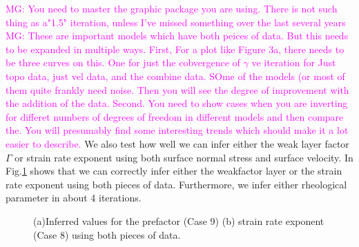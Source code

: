 \documentclass[12pt]{article}
\newcommand{\mgnote}[1]{\textcolor{magenta}{MG: #1}}
\begin{document}
\mgnote{You need to master the graphic package you are using. There is not such thing as a"1.5" iteration, unless I've missed something over the last several years}
\mgnote{These are important models which have both peices of data. But this needs to be expanded in multiple ways. First, For a plot like Figure 3a, there needs to be three curves on this. One for just the cobvergence of $\gamma$ ve iteration for Just topo data, just vel data, and the combine data. SOme of the models (or most of them quite frankly need noise. Then you will see the degree of improvement with the addition of the data. Second. You need to show cases when you are inverting for differet numbers of degrees of freedom in different models and then compare the. You will presumably find some interesting trends which should make it a lot easier to describe.}
We also test how well we can infer either the weak layer factor $\Gamma$ or strain rate exponent using both surface normal stress and surface velocity. In Fig.\ref{fig:joint_inversion} shows that we can correctly infer either the weakfactor layer or the strain rate exponent using both pieces of data. Furthermore, we infer either rheological parameter in about 4 iterations.
\begin{figure}[H]
\centering
{}
  \caption{(a)Inferred values for the prefactor (Case 9) (b) strain rate exponent (Case 8) using both pieces of data.}
\label{fig:joint_inversion}
\end{figure}
\end{document}
